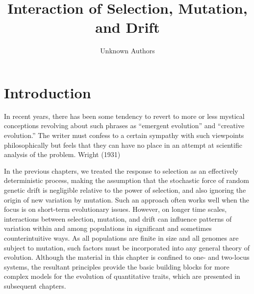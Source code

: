 \documentclass{article}
\title{Interaction of Selection,
Mutation, and Drift}
\author{Unknown Authors}
\date{}
\begin{document}
\maketitle

\begin{abstract}

\end{abstract}

\section{Introduction}
In recent years, there has been some tendency to revert to more or less mystical conceptions revolving about such phrases as “emergent evolution” and “creative evolution.” The writer must confess to a certain sympathy with such viewpoints philosophically but feels that they can have no place in an attempt at scientific analysis of the problem. Wright (1931)

In the previous chapters, we treated the response to selection as an effectively deterministic process, making the assumption that the stochastic force of random genetic drift is negligible relative to the power of selection, and also ignoring the origin of new variation by mutation. Such an approach often works well when the focus is on short-term evolutionary issues. However, on longer time scales, interactions between selection, mutation, and drift can influence patterns of variation within and among populations in significant and sometimes counterintuitive ways. As all populations are finite in size and all genomes are subject to mutation, such factors must be incorporated into any general theory of evolution. Although the material in this chapter is confined to one- and two-locus systems, the resultant principles provide the basic building blocks for more complex models for the evolution of quantitative traits, which are presented in subsequent chapters.
\end{document}
